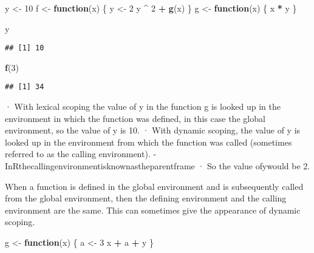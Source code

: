 \documentclass[
]{article}
\newenvironment{Shaded}{\begin{snugshade}}{\end{snugshade}}
\newcommand{\ControlFlowTok}[1]{\textcolor[rgb]{0.13,0.29,0.53}{\textbf{#1}}}
\newcommand{\DecValTok}[1]{\textcolor[rgb]{0.00,0.00,0.81}{#1}}
\newcommand{\FunctionTok}[1]{\textcolor[rgb]{0.13,0.29,0.53}{\textbf{#1}}}
\newcommand{\NormalTok}[1]{#1}
\newcommand{\OtherTok}[1]{\textcolor[rgb]{0.56,0.35,0.01}{#1}}
\newcommand{\SpecialCharTok}[1]{\textcolor[rgb]{0.81,0.36,0.00}{\textbf{#1}}}
\begin{document}
\begin{Shaded}
\begin{Highlighting}[]
\NormalTok{y }\OtherTok{\textless{}{-}} \DecValTok{10}
\NormalTok{f }\OtherTok{\textless{}{-}} \ControlFlowTok{function}\NormalTok{(x) \{}
\NormalTok{  y }\OtherTok{\textless{}{-}} \DecValTok{2}
\NormalTok{  y }\SpecialCharTok{\^{}} \DecValTok{2} \SpecialCharTok{+} \FunctionTok{g}\NormalTok{(x)}
\NormalTok{\}}
\NormalTok{g }\OtherTok{\textless{}{-}} \ControlFlowTok{function}\NormalTok{(x) \{}
\NormalTok{  x }\SpecialCharTok{*}\NormalTok{ y}
\NormalTok{\}}
\end{Highlighting}
\end{Shaded}

\begin{Shaded}
\begin{Highlighting}[]
\NormalTok{y}
\end{Highlighting}
\end{Shaded}

\begin{verbatim}
## [1] 10
\end{verbatim}

\begin{Shaded}
\begin{Highlighting}[]
\FunctionTok{f}\NormalTok{(}\DecValTok{3}\NormalTok{)}
\end{Highlighting}
\end{Shaded}

\begin{verbatim}
## [1] 34
\end{verbatim}

· With lexical scoping the value of y in the function g is looked up in
the environment in which the function was defined, in this case the
global environment, so the value of y is 10. · With dynamic scoping, the
value of y is looked up in the environment from which the function was
called (sometimes referred to as the calling environment). -
InRthecallingenvironmentisknownastheparentframe · So the value ofywould
be 2.

When a function is defined in the global environment and is subsequently
called from the global environment, then the defining environment and
the calling environment are the same. This can sometimes give the
appearance of dynamic scoping.

\begin{Shaded}
\begin{Highlighting}[]
\NormalTok{g }\OtherTok{\textless{}{-}} \ControlFlowTok{function}\NormalTok{(x) \{}
\NormalTok{  a }\OtherTok{\textless{}{-}} \DecValTok{3}
\NormalTok{  x }\SpecialCharTok{+}\NormalTok{ a }\SpecialCharTok{+}\NormalTok{ y}
\NormalTok{\}}
\end{Highlighting}
\end{Shaded}
\end{document}
